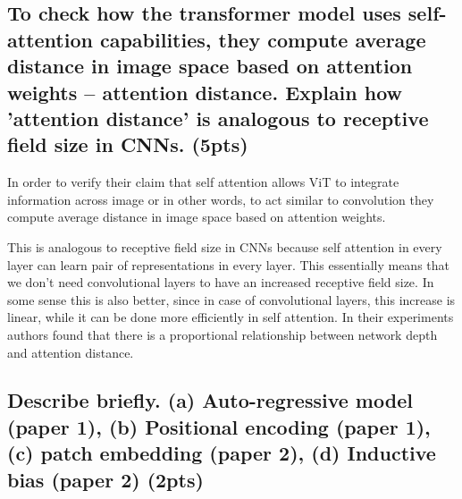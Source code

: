 \documentclass{article}
\begin{document}
\subsection{To check how the transformer model uses self-attention capabilities, they compute average distance in image space based on attention weights – attention distance. Explain how ’attention distance’ is analogous to receptive field size in CNNs. (5pts)}

In order to verify their claim that self attention allows ViT to integrate information across image or in other words, to act similar to convolution they compute average distance in image space based on attention weights.

This is analogous to receptive field size in CNNs because self attention in every layer can learn pair of representations in every layer. This essentially means that we don't need convolutional layers to have an increased receptive field size. In some sense this is also better, since in case of convolutional layers, this increase is linear, while it can be done more efficiently in self attention. In their experiments authors found that there is a proportional relationship between network depth and attention distance.

\subsection{Describe briefly. (a) Auto-regressive model (paper 1), (b) Positional encoding (paper 1), (c) patch embedding (paper 2), (d) Inductive bias (paper 2) (2pts)}
\end{document}
